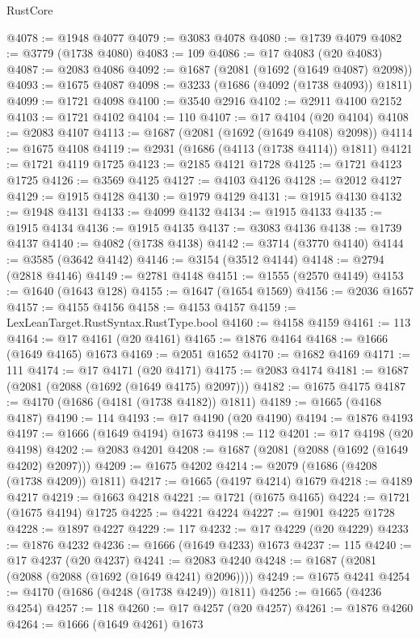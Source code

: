 \begin{lexlean}{RustCore}
\begin{coremodule}
@4078 := @1948 @4077
@4079 := @3083 @4078
@4080 := @1739 @4079
@4082 := @3779 (@1738 @4080)
@4083 := 109
@4086 := @17 @4083 (@20 @4083)
@4087 := @2083 @4086
@4092 := @1687 (@2081 (@1692 (@1649 @4087) @2098))
@4093 := @1675 @4087
@4098 := @3233 (@1686 (@4092 (@1738 @4093)) @1811)
@4099 := @1721 @4098
@4100 := @3540 @2916
@4102 := @2911 @4100 @2152
@4103 := @1721 @4102
@4104 := 110
@4107 := @17 @4104 (@20 @4104)
@4108 := @2083 @4107
@4113 := @1687 (@2081 (@1692 (@1649 @4108) @2098))
@4114 := @1675 @4108
@4119 := @2931 (@1686 (@4113 (@1738 @4114)) @1811)
@4121 := @1721 @4119 @1725
@4123 := @2185 @4121 @1728
@4125 := @1721 @4123 @1725
@4126 := @3569 @4125
@4127 := @4103 @4126
@4128 := @2012 @4127
@4129 := @1915 @4128
@4130 := @1979 @4129
@4131 := @1915 @4130
@4132 := @1948 @4131
@4133 := @4099 @4132
@4134 := @1915 @4133
@4135 := @1915 @4134
@4136 := @1915 @4135
@4137 := @3083 @4136
@4138 := @1739 @4137
@4140 := @4082 (@1738 @4138)
@4142 := @3714 (@3770 @4140)
@4144 := @3585 (@3642 @4142)
@4146 := @3154 (@3512 @4144)
@4148 := @2794 (@2818 @4146)
@4149 := @2781 @4148
@4151 := @1555 (@2570 @4149)
@4153 := @1640 (@1643 @128)
@4155 := @1647 (@1654 @1569)
@4156 := @2036 @1657
@4157 := @4155 @4156
@4158 := @4153 @4157
@4159 := LexLeanTarget.RustSyntax.RustType.bool
@4160 := @4158 @4159
@4161 := 113
@4164 := @17 @4161 (@20 @4161)
@4165 := @1876 @4164
@4168 := @1666 (@1649 @4165) @1673
@4169 := @2051 @1652
@4170 := @1682 @4169
@4171 := 111
@4174 := @17 @4171 (@20 @4171)
@4175 := @2083 @4174
@4181 := @1687 (@2081 (@2088 (@1692 (@1649 @4175) @2097)))
@4182 := @1675 @4175
@4187 := @4170 (@1686 (@4181 (@1738 @4182)) @1811)
@4189 := @1665 (@4168 @4187)
@4190 := 114
@4193 := @17 @4190 (@20 @4190)
@4194 := @1876 @4193
@4197 := @1666 (@1649 @4194) @1673
@4198 := 112
@4201 := @17 @4198 (@20 @4198)
@4202 := @2083 @4201
@4208 := @1687 (@2081 (@2088 (@1692 (@1649 @4202) @2097)))
@4209 := @1675 @4202
@4214 := @2079 (@1686 (@4208 (@1738 @4209)) @1811)
@4217 := @1665 (@4197 @4214) @1679
@4218 := @4189 @4217
@4219 := @1663 @4218
@4221 := @1721 (@1675 @4165)
@4224 := @1721 (@1675 @4194) @1725
@4225 := @4221 @4224
@4227 := @1901 @4225 @1728
@4228 := @1897 @4227
@4229 := 117
@4232 := @17 @4229 (@20 @4229)
@4233 := @1876 @4232
@4236 := @1666 (@1649 @4233) @1673
@4237 := 115
@4240 := @17 @4237 (@20 @4237)
@4241 := @2083 @4240
@4248 := @1687 (@2081 (@2088 (@2088 (@1692 (@1649 @4241) @2096))))
@4249 := @1675 @4241
@4254 := @4170 (@1686 (@4248 (@1738 @4249)) @1811)
@4256 := @1665 (@4236 @4254)
@4257 := 118
@4260 := @17 @4257 (@20 @4257)
@4261 := @1876 @4260
@4264 := @1666 (@1649 @4261) @1673

\end{coremodule}
\end{lexlean}
